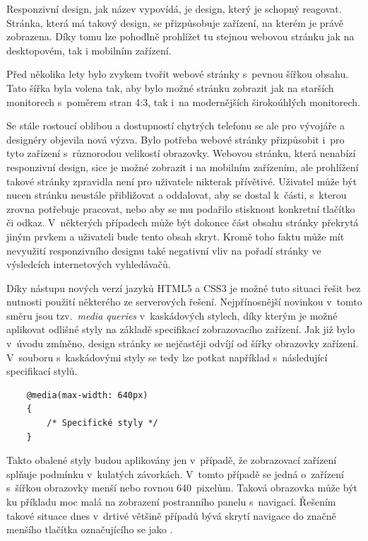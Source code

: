 Responzivní design, jak název vypovídá, je design, který je schopný reagovat. Stránka, která má takový design, se přizpůsobuje zařízení, na kterém je právě zobrazena. Díky tomu lze pohodlně prohlížet tu stejnou webovou stránku jak na desktopovém, tak i mobilním zařízení. 

Před několika lety bylo zvykem tvořit webové stránky s~pevnou šířkou obsahu. Tato šířka byla volena tak, aby bylo možné stránku zobrazit jak na starších monitorech s~poměrem stran 4:3, tak i~na modernějších širokoúhlých monitorech. 

Se stále rostoucí oblibou a dostupností chytrých telefonu se ale pro vývojáře a designéry objevila nová výzva. Bylo potřeba webové stránky přizpůsobit i~pro tyto zařízení s~různorodou velikostí obrazovky. Webovou stránku, která nenabízí responzivní design, sice je možné zobrazit i na mobilním zařízením, ale prohlížení takové stránky zpravidla není pro uživatele nikterak přívětivé. Uživatel může být nucen stránku neustále přibližovat a oddalovat, aby se dostal k~části, s~kterou zrovna potřebuje pracovat, nebo aby se mu podařilo stisknout konkretní tlačítko či odkaz. V~některých případech může být dokonce část obsahu stránky překrytá jiným prvkem a uživateli bude tento obsah skryt. Kromě toho faktu může mít nevyužití responzivního designu také negativní vliv na pořadí stránky ve výsledcích internetových vyhledávačů.

Díky nástupu nových verzí jazyků HTML5 a CSS3 je možné tuto situaci řešit bez nutnosti použití některého ze serverových řešení. Nejpřínosnější novinkou v~tomto směru jsou tzv.~\emph{media queries} v~kaskádových stylech, díky kterým je možné aplikovat odlišné styly na základě specifikací zobrazovacího zařízení. Jak již bylo v~úvodu zmíněno, design stránky se nejčastěji odvíjí od šířky obrazovky zařízení. V~souboru s~kaskádovými styly se tedy lze potkat například s~následující specifikací stylů.

\begin{verbatim}
    @media(max-width: 640px)
    {
        /* Specifické styly */
    }
\end{verbatim}

Takto obalené styly budou aplikovány jen v~případě, že zobrazovací zařízení splňuje podmínku v~kulatých závorkách. V~tomto případě se jedná o~zařízení s~šířkou obrazovky menší nebo rovnou 640~pixelům. Taková obrazovka může být ku příkladu moc malá na zobrazení postranního panelu s~navigací. Řešením takové situace dnes v~drtivé většině případů bývá skrytí navigace do značně menšího tlačítka označujícího se jako .


